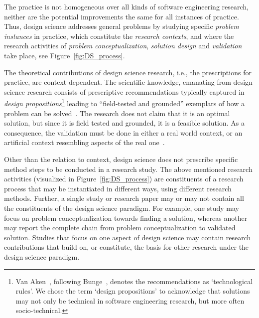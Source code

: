 \documentclass[graybox]{svmult}
\begin{document}
The practice is not homogeneous over all kinds of software engineering research, neither are the potential improvements the same for all instances of practice. Thus, design science addresses general problems by studying specific \emph{problem instances} in practice, which constitute the \emph{research contexts}, and where the research activities of \emph{problem conceptualization}, \emph{solution design} and \emph{validation} take place, see Figure~\ref{fig:DS_process}. 


The theoretical contributions of design science research, i.e., the prescriptions for practice, are context dependent. The scientific knowledge, emanating from design science research consists of prescriptive recommendations typically captured in \emph{design propositions}\footnote{Van Aken~\cite{van_aken_management_2004}, following Bunge~\cite{bunge_philosophy_1998}, denotes the recommendations as `technological rules'. We chose the term `design propositions' to acknowledge that solutions may not only be technical in software engineering research, but more often socio-technical.} leading to ``field-tested and grounded'' exemplars of how a problem can be solved~\cite{van_aken_management_2004}. The research does not claim that it is an optimal solution, but since it is field tested and grounded, it is a feasible solution.
As a consequence, the validation must be done in either a real world context, or an artificial context resembling aspects of the real one~\cite{wieringa_what_2014}.  

Other than the relation to context, design science does not prescribe specific method steps to be conducted in a research study. The above mentioned research activities (visualized in Figure~\ref{fig:DS_process}) are constituents of a research process that may be instantiated in different ways, using different research methods. 
Further, a single study or research paper may or may not contain all the constituents of the design science paradigm. For example, one study may focus on problem conceptualization towards finding a solution, whereas another may report the complete chain from problem conceptualization to validated solution. Studies that focus on one aspect of design science may contain research contributions that build on, or constitute, the basis for other research under the design science paradigm.
\end{document}
